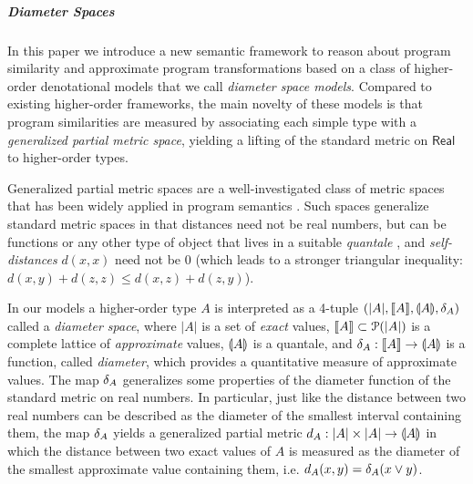 \subparagraph*{Diameter Spaces}

In this paper we introduce a new semantic framework to reason about program similarity and approximate program transformations based on 
a class of higher-order denotational models that we call \emph{diameter space models}. Compared to existing higher-order frameworks, the main novelty of these models is that program similarities are measured by associating each simple type with 
 a \emph{generalized partial metric space}, yielding a lifting of the standard metric on $\mathsf{Real}$ to higher-order types.

Generalized partial metric spaces are a well-investigated class of metric spaces that has been widely applied in program semantics \cite{bkmp:partial-metrics, Bukatin1997, doi:10.1111/j.1749-6632.1994.tb44144.x, Schellekens2004, Samet:2013aa, Stubbe2018, HE201999}. 
Such spaces generalize standard metric spaces in that distances
need not be real numbers, but can be functions or any other type of object that lives in a suitable \emph{quantale} \cite{Hofmann2014}, and \emph{self-distances} $d(x,x)$ need not be $0$ (which leads to a stronger triangular inequality: $d(x,y) + d(z,z)\leq d(x,z)+d(z,y)$).


In our models a higher-order type $A$ is interpreted as a 4-tuple $(|A|, \llbracket A \rrbracket, \llparenthesis A \rrparenthesis, \delta_{A})$ called a \emph{diameter space}, where $|A|$ is a set of \emph{exact} values, $\llbracket A \rrbracket\subset \mathcal P(|A|)$ is a complete lattice of \emph{approximate} values, $\llparenthesis A \rrparenthesis$ is a {quantale}, and $\delta_{A}: \llbracket A \rrbracket\to \llparenthesis A \rrparenthesis$ is a function, called \emph{diameter}, which provides a quantitative measure of approximate values.
The map $\delta_{A}$ generalizes some properties of the diameter function of the standard metric on real numbers. In particular, just like the distance between two real numbers can be described as the diameter of the smallest interval containing them, the map $\delta_{A}$ yields a generalized partial metric  $d_{A}:|A|\times |A|\to \llparenthesis A \rrparenthesis$ in which the distance between two exact values of $A$ is measured as the diameter of the smallest approximate value containing them, i.e.  $d_{A}(x,y)=\delta_{A}(x\vee y)$. 



